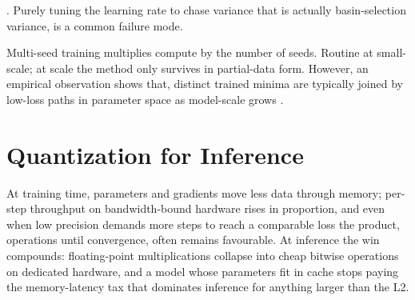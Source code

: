 . Purely tuning the learning rate to chase variance that is actually 
basin-selection variance, is a common failure mode.

Multi-seed training multiplies compute by the number of seeds.
Routine at small-scale; at scale
the method only survives in partial-data form.
However, an empirical observation shows that,
distinct trained minima are typically joined by low-loss paths in parameter space as model-scale grows 
\cite{garipov2018modeconnectivity}.









\newpage
\section{Quantization for Inference}


At training time, parameters and gradients move less data through memory;
per-step throughput on bandwidth-bound hardware rises in proportion,
and even when low precision demands more steps to reach a comparable loss the product, 
operations until convergence, often remains favourable.
At inference the win compounds: floating-point multiplications collapse into cheap bitwise operations on dedicated hardware,
and a model whose parameters fit in cache stops paying the memory-latency tax that dominates inference for anything larger than the L2.

\begin{marginfigure}
    \centering
    \caption{Loss against bits per parameter on the chocolate dataset.
    Binary precision pays a sharp penalty; the curve drops fast and flattens by integer precision.
    Most of the win sits in the first few bits.}
    \label{fig:precision_loss}
\end{marginfigure}

